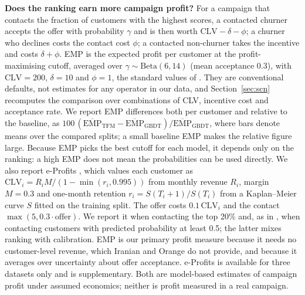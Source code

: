 \documentclass[11pt]{article}
\begin{document}
\textbf{Does the ranking earn more campaign profit?} For a campaign that contacts the fraction of customers with the
highest scores, a contacted churner accepts the offer with probability $\gamma$ and is then worth
$\mathrm{CLV}-\delta-\phi$; a churner who declines costs the contact cost $\phi$; a contacted non-churner takes the
incentive and costs $\delta+\phi$. EMP is the expected profit per customer at the profit-maximising cutoff, averaged
over $\gamma\sim\mathrm{Beta}(6,14)$ (mean acceptance 0.3), with $\mathrm{CLV}=200$, $\delta=10$ and $\phi=1$, the
standard values of \cite{verbraken2013emp}. They are conventional defaults, not estimates for any operator in our
data, and Section~\ref{sec:scn} recomputes the comparison over \nScenarios{} combinations of CLV, incentive cost and
acceptance rate. We report EMP differences both per customer and relative to the baseline, as
$100\,(\overline{\mathrm{EMP}}_{\mathrm{TFM}}-\overline{\mathrm{EMP}}_{\mathrm{GBDT}})/\overline{\mathrm{EMP}}_{\mathrm{GBDT}}$,
where bars denote means over the compared splits; a small baseline EMP makes the relative figure large. Because EMP picks the best cutoff for each model, it depends only on the ranking: a high EMP does not mean the
probabilities can be used directly. We also report e-Profits \cite{manzoor2025eprofits}, which values each customer as
$\mathrm{CLV}_i = R_i M/(1-\min(r_i,0.995))$ from monthly revenue $R_i$, margin $M=0.3$ and one-month retention
$r_i = S(T_i+1)/S(T_i)$ from a Kaplan--Meier curve $S$ \cite{kaplan1958nonparametric} fitted on the training split. The
offer costs $0.1\,\mathrm{CLV}_i$ and the contact $\max(5, 0.3\cdot\text{offer})$. We report it when contacting the top
20\% and, as in \cite{manzoor2025eprofits}, when contacting customers with predicted probability at least 0.5; the
latter mixes ranking with calibration. EMP is our primary profit measure because it needs no customer-level revenue,
which Iranian and Orange do not provide, and because it averages over uncertainty about offer acceptance. e-Profits is
available for three datasets only and is supplementary. Both are model-based estimates of campaign profit under
assumed economics; neither is profit measured in a real campaign.
\end{document}
